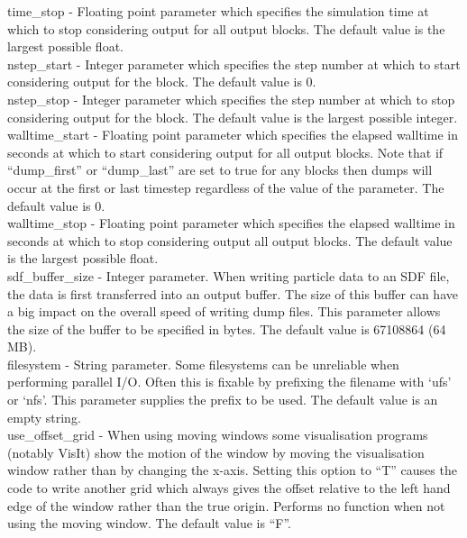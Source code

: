 {\emphtext time\_stop} - Floating point parameter which specifies the
  simulation time at which to stop considering output for all output blocks.
  The default value is the largest possible float.\\

{\emphtext nstep\_start} - Integer parameter which specifies the
  step number at which to start considering output for the block.
  The default value is 0.\\

{\emphtext nstep\_stop} - Integer parameter which specifies the
  step number at which to stop considering output for the block.
  The default value is the largest possible integer.\\

{\emphtext walltime\_start} - Floating point parameter which specifies the
  elapsed walltime in seconds at which to start considering output for all
  output blocks. Note
  that if ``dump\_first'' or ``dump\_last'' are set to true for any blocks then
  dumps will occur at the first or last timestep regardless of the value of
  the 
  parameter.
  The default value is 0.\\

{\emphtext walltime\_stop} - Floating point parameter which specifies the
  elapsed walltime in seconds at which to stop considering output all
  output blocks. The default value is the largest possible float.\\

{\emphtext sdf\_buffer\_size} - Integer parameter. When writing particle data
to an SDF file, the data is first transferred into an output buffer. The
size of this buffer can have a big impact on the overall speed of writing
dump files. This parameter allows the size of the buffer to be specified in
bytes. The default value is 67108864 (64 MB).\\

{\emphtext filesystem} - String parameter. Some filesystems can be unreliable
when performing parallel I/O. Often this is fixable by prefixing the filename
with `ufs' or `nfs'. This parameter supplies the prefix to be used. The
default value is an empty string.\\

{\emphtext use\_offset\_grid} - When using moving windows some visualisation
programs (notably VisIt) show the motion of the window by moving the
visualisation window rather than by changing the x-axis. Setting this option to
``T'' causes the code to write another grid which always gives the offset
relative to the left hand edge of the window rather than the true origin.
Performs no function when not using the moving window. The default value
is ``F''.\\

